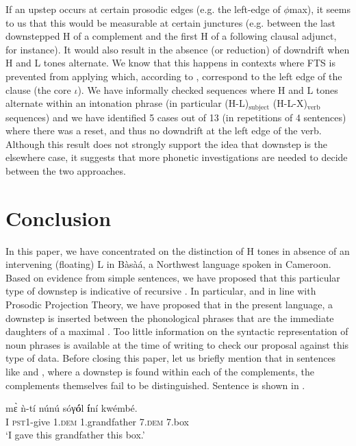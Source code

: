 \documentclass[output=paper,newtxmath,modfonts,nonflat,hidelinks]{langsci/langscibook}
\begin{document}
If an upstep occurs at certain prosodic edges (e.g. the left-edge of $\phi$max), it seems to us that this would be measurable at certain junctures (e.g. between the last downstepped H of a complement and the first H of a following clausal adjunct, for instance). It would also result in the absence (or reduction) of downdrift when H and L tones alternate. We know that this happens in  contexts where FTS is prevented from applying which, according to \citet{HamlaouiSzendroi16}, correspond to the left edge of the clause (the core $\iota$). We have informally checked sequences where H and L tones alternate within an intonation phrase (in particular (H-L)$_{\text{subject}}$ (H-L-X)$_{\text{verb}}$ sequences) and we have identified 5 cases out of 13 (in repetitions of 4 sentences) where there was a reset, and thus no downdrift at the left edge of the verb. Although this result does not strongly support the idea that downstep is the elsewhere case, it suggests that more phonetic investigations are needed to decide between the two approaches.

 
\section{Conclusion}\label{sec:HamlaouiMakasso:5} 

In this paper, we have concentrated on the distinction of  H tones in absence of an intervening (floating) L  in Bàsà{á}, a Northwest  language spoken in Cameroon. Based on evidence from simple sentences, we have proposed that this particular type of downstep is indicative of recursive . In particular, and in line with  Prosodic Projection Theory, we have proposed that in the present language, a downstep is inserted between the phonological phrases that are the immediate daughters of a maximal . Too little information on the syntactic representation of noun phrases is available at the time of writing to check our proposal against this type of data. 
Before closing this paper, let us briefly mention that in sentences like  and , where a downstep is found within each of the complements, the complements themselves fail to be distinguished. Sentence  is shown in . 

\ea \gll m\`ɛ ǹ-tí núnú {\textdownstep}sóγ\textbf{ó}l \textbf{í}ní {\textdownstep}kwémbé.\\
I \textsc{pst1}-give 1.\textsc{dem} 1.grandfather 7.\textsc{dem} 7.box\\
\glt `I gave this grandfather this box.'\label{ex:HamlaouiMakasso:27}
\z
\end{document}
